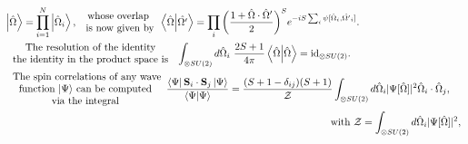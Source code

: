 \documentclass{homework}
\begin{document}
\begin{equation}
\begin{split}
    &\ket{\hat{\Omega}} = \prod_{i=1}^N \ket{\hat{\Omega}_i}, \begin{array}{c}
         \textnormal{ whose overlap }  \\
         \textnormal{ is now given by}
    \end{array} \bra{\hat{\Omega}}\ket{\hat{\Omega'}} = \prod_{i} \bigg(\frac{1 + \hat{\Omega} \cdot \hat{\Omega}'}{2} \bigg)^S e^{-iS \sum_{i} \psi[\hat{\Omega}_i, \hat{\Omega'}_i]}. \\
    & \begin{array}{c}
         \textnormal{ The resolution of the identity }  \\
         \textnormal{ the identity in the product space is } 
    \end{array} \int_{\otimes SU(2)} d\hat{\Omega}_i \blanky \frac{2S+1}{4\pi} \bra{\hat{\Omega}} \ket{\hat{\Omega}} = \textnormal{id}_{\otimes SU(2)}. \\
    & \begin{array}{c}
         \textnormal{ The spin correlations of any wave}  \\
         \textnormal{ function $\ket{\Psi}$ can be computed } \\
         \textnormal{ via the integral }
    \end{array} \frac{\bra{\Psi} \spin_i \cdot \spin_j \ket{\Psi}}{\bra{\Psi} \ket{\Psi}} = \frac{(S+1 - \delta_{ij})(S+1)}{\mathcal{Z}} \int_{\otimes SU(2)} d\hat{\Omega}_i |\Psi[\hat{\Omega}]|^2 \hat{\Omega}_i \cdot \hat{\Omega}_j, \\
    & \blanky\blanky\blanky\blanky\blanky\blanky\blanky\blanky\blanky\blanky\blanky\blanky\blanky\blanky\blanky\blanky\blanky\blanky\blanky\blanky\blanky\blanky\blanky\blanky\blanky\blanky\blanky\blanky\blanky\blanky\blanky\blanky \blanky\blanky\blanky\blanky\blanky\blanky\blanky\blanky\blanky\blanky\blanky\blanky\blanky\blanky\blanky\blanky\blanky\blanky\blanky\blanky\blanky\blanky\blanky\blanky\blanky\blanky\blanky\blanky\blanky\blanky\blanky\blanky \blanky\blanky\blanky\blanky\blanky\blanky\blanky\blanky\blanky\blanky\blanky\blanky\blanky\blanky\blanky\blanky\blanky\blanky\blanky\blanky\blanky\blanky\blanky\blanky\blanky\blanky\blanky\blanky\blanky\blanky\blanky\blanky \textnormal{ with } \mathcal{Z} = \int_{\otimes SU(2)} d\hat{\Omega}_i |\Psi[\hat{\Omega}]|^2,
\end{split}
\end{equation}
\end{document}
